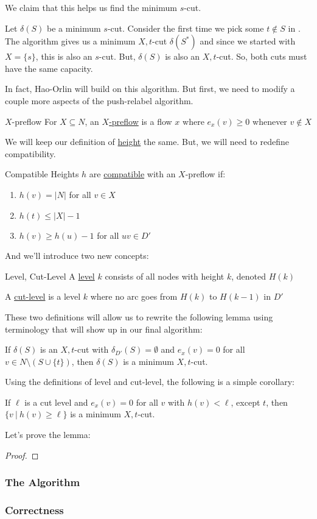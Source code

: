 We claim that this helps us find the minimum $s$-cut.

Let $\delta(S)$ be a minimum $s$-cut.
Consider the first time we pick some $t \not\in S$ in .
The algorithm gives us a minimum $X,t$-cut $\delta(S^*)$ and since we started with $X = \{s\}$, this is also an $s$-cut.
But, $\delta(S)$ is also an $X,t$-cut.
So, both cuts must have the same capacity.

In fact, Hao-Orlin will build on this algorithm.
But first, we need to modify a couple more aspects of the push-relabel algorithm.

\begin{definition}{$X$-preflow}{}
    For $X \subseteq N$, an \underline{$X$-preflow} is a flow $x$ where $e_x(v) \geq 0$ whenever $v \not\in X$
\end{definition}

We will keep our definition of \underline{height} the same.
But, we will need to redefine compatibility.

\begin{definition}{Compatible}{}
    Heights $h$ are \underline{compatible} with an $X$-preflow if:
    \begin{enumerate}
        \item $h(v) = |N|$ for all $v \in X$
        \item $h(t) \leq |X| - 1$
        \item $h(v) \geq h(u) - 1$ for all $uv \in D'$
    \end{enumerate}
\end{definition}

And we'll introduce two new concepts:
\begin{definition}{Level, Cut-Level}{}
    A \underline{level} $k$ consists of all nodes with height $k$, denoted $H(k)$

    A \underline{cut-level} is a level $k$ where no arc goes from $H(k)$ to $H(k-1)$ in $D'$
\end{definition}

These two definitions will allow us to rewrite the following lemma using terminology that will show up in our final algorithm:

\begin{lemma}{}{}
    If $\delta(S)$ is an $X,t$-cut with $\delta_{D'}(S) = \emptyset$ and $e_x(v) = 0$ for all $v \in N\setminus(S \cup \{t\})$, then $\delta(S)$ is a minimum $X,t$-cut.
\end{lemma}

Using the definitions of level and cut-level, the following is a simple corollary:
\begin{corollary}{}{}
    If $\ell$ is a cut level and $e_x(v) = 0$ for all $v$ with $h(v) < \ell$, except $t$, then $\{v\:|\:h(v) \geq \ell\}$ is a minimum $X,t$-cut.
\end{corollary}

Let's prove the lemma:
\begin{proof}
    
\end{proof}

\subsubsection{The Algorithm}
\subsubsection{Correctness}
